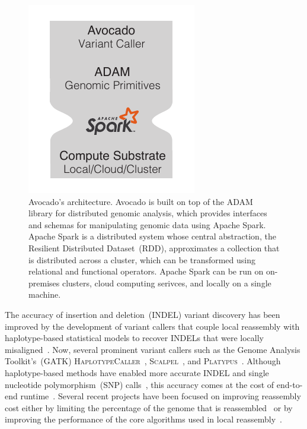 \documentclass{bioinfo}
\begin{document}
\begin{figure}[h]
\begin{center}
\includegraphics[width=0.95\linewidth]{architecture.pdf}
\end{center}
\caption{Avocado's architecture. Avocado is built on top of the ADAM library for
distributed genomic analysis, which provides interfaces and schemas for
manipulating genomic data using Apache Spark. Apache Spark is a distributed system
whose central abstraction, the Resilient Distributed Dataset~(RDD), approximates
a collection that is distributed across a cluster, which can be transformed using
relational and functional operators. Apache Spark can be run on on-premises
clusters, cloud computing serivces, and locally on a single machine.}
\label{fig:architecture}
\end{figure}

The accuracy of insertion and deletion~(INDEL) variant discovery has been improved by the development
of variant callers that couple local reassembly with haplotype-based statistical models to recover INDELs
that were locally misaligned~\citep{albers11}. Now, several prominent variant callers such as the Genome
Analysis Toolkit's~(GATK) \textsc{HaplotypeCaller}~\citep{depristo11}, \textsc{Scalpel}~\citep{narzisi14}, and
\textsc{Platypus}~\citep{rimmer14}. Although haplotype-based methods have enabled more accurate INDEL
and single nucleotide polymorphism~(SNP) calls~\citep{bao14}, this accuracy comes at the cost of
end-to-end runtime~\citep{talwalkar14}. Several recent projects have been focused on improving
reassembly cost either by limiting the percentage of the genome that is reassembled~\citep{bloniarz14} or
by improving the performance of the core algorithms used in local reassembly~\citep{rimmer14}.
\end{document}
